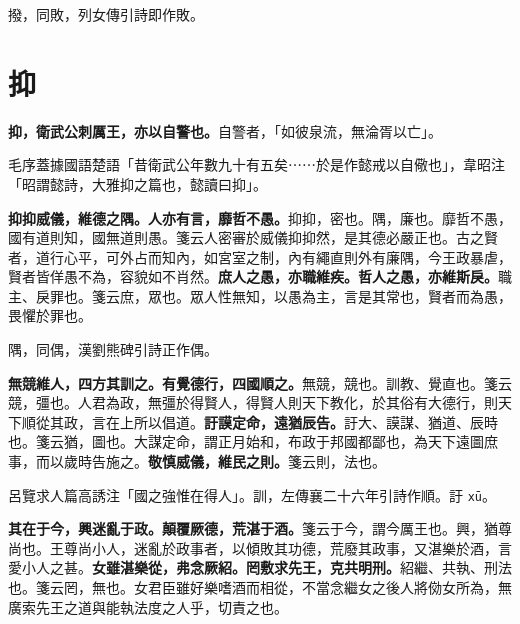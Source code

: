 \begin{quoting}撥，同敗，列女傳引詩即作敗。\end{quoting}

\section{抑}


\textbf{抑，衛武公刺厲王，亦以自警也。}{\footnotesize 自警者，「如彼泉流，無淪胥以亡」。}

\begin{quoting}毛序蓋據國語楚語「昔衛武公年數九十有五矣⋯⋯於是作懿戒以自儆也」，韋昭注「昭謂懿詩，大雅抑之篇也，懿讀曰抑」。\end{quoting}

\textbf{抑抑威儀，維德之隅。人亦有言，靡哲不愚。}{\footnotesize 抑抑，密也。隅，廉也。靡哲不愚，國有道則知，國無道則愚。箋云人密審於威儀抑抑然，是其德必嚴正也。古之賢者，道行心平，可外占而知內，如宮室之制，內有繩直則外有廉隅，今王政暴虐，賢者皆佯愚不為，容貌如不肖然。}\textbf{庶人之愚，亦職維疾。哲人之愚，亦維斯戾。}{\footnotesize 職主、戾罪也。箋云庶，眾也。眾人性無知，以愚為主，言是其常也，賢者而為愚，畏懼於罪也。}

\begin{quoting}隅，同偶，漢劉熊碑引詩正作偶。\end{quoting}

\textbf{無競維人，四方其訓之。有覺德行，四國順之。}{\footnotesize 無競，競也。訓教、覺直也。箋云競，彊也。人君為政，無彊於得賢人，得賢人則天下教化，於其俗有大德行，則天下順從其政，言在上所以倡道。}\textbf{訏謨定命，遠猶辰告。}{\footnotesize 訏大、謨謀、猶道、辰時也。箋云猶，圖也。大謀定命，謂正月始和，布政于邦國都鄙也，為天下遠圖庶事，而以歲時告施之。}\textbf{敬慎威儀，維民之則。}{\footnotesize 箋云則，法也。}

\begin{quoting}呂覽求人篇高誘注「國之強惟在得人」。訓，左傳襄二十六年引詩作順。訏 \texttt{xū}。\end{quoting}

\textbf{其在于今，興迷亂于政。顛覆厥德，荒湛于酒。}{\footnotesize 箋云于今，謂今厲王也。興，猶尊尚也。王尊尚小人，迷亂於政事者，以傾敗其功德，荒廢其政事，又湛樂於酒，言愛小人之甚。}\textbf{女雖湛樂從，弗念厥紹。罔敷求先王，克共明刑。}{\footnotesize 紹繼、共執、刑法也。箋云罔，無也。女君臣雖好樂嗜酒而相從，不當念繼女之後人將俲女所為，無廣索先王之道與能執法度之人乎，切責之也。}

